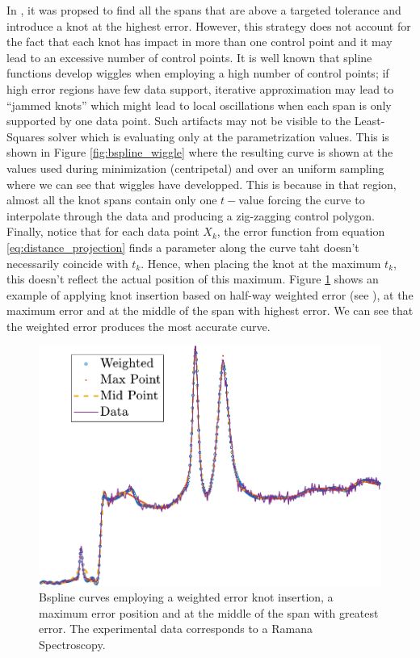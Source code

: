  In \cite[Ch. ]{nurbs_book}, 
 it was propsed to find all the spans that are above a targeted tolerance and introduce a knot at the highest error. 
 However, this strategy does not account  
 for the fact that each knot has impact in more than one control point and it may lead to an excessive number
  of control points. It is well known that spline functions develop wiggles when employing a high number of control points; 
   if high error regions have few data support, iterative approximation may lead to ``jammed knots'' which might lead to local oscillations
   when each span is only supported by one data point. Such artifacts may not be visible to the Least-Squares solver 
   which is evaluating only at the parametrization values. This is shown in Figure \ref{fig:bspline_wiggle} where the resulting curve is shown at the values used during minimization (centripetal) 
and over an uniform sampling where we can see that wiggles have developped. This is because in that region, almost all the 
 knot spans contain only one $t-$value forcing the curve to interpolate through the data and producing a zig-zagging control polygon. 
   Finally, notice that for each data point $X_k$, 
   the error function from equation \eqref{eq:distance_projection} finds a parameter along the curve 
    taht doesn't necessarily coincide with $t_k$. Hence, when placing the knot at the maximum $t_k$, this doesn't reflect the actual position of this maximum. 
    Figure \ref{fig:knot_placement} shows an example of applying knot insertion based on half-way weighted error (see ), at the maximum error and at the middle of the span with 
    highest error. We can see that the weighted error produces the most accurate curve.  
 
 \begin{figure}
 \centering
  \includegraphics[width = \textwidth]{knot_placement_plot}
  \caption{\label{fig:knot_placement} Bspline curves employing a weighted error knot insertion, a maximum error position and at the middle of the span with greatest error. 
  The experimental data corresponds to a Ramana Spectroscopy.}
 \end{figure}

